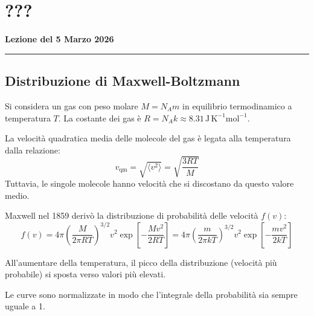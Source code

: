 \documentclass{article}
\theoremstyle{remark}
\newcommand{\thelezione}{}
\newcommand{\lezione}[2]{
\newpage
\renewcommand{\thelezione}{#2} 
\section{#1} 
\noindent\textbf{\color{RoyalBlue}Lezione del #2}\par\vspace{0.5em}\hrule\vspace{1em}
}
\begin{document}
\lezione{???}{5 Marzo 2026}




\pagebreak

\subsection{Distribuzione di Maxwell-Boltzmann}

Si considera un gas con peso molare \( M = N_A m \) in equilibrio termodinamico a temperatura \( T \). La costante dei gas è \( R = N_A k \approx 8.31 \, \text{J} \, \text{K}^{-1} \text{mol}^{-1} \).

La velocità quadratica media delle molecole del gas è legata alla temperatura dalla relazione:
    \[
    v_{\text{qm}} = \sqrt{\langle v^2 \rangle} = \sqrt{\frac{3RT}{M}}
    \]
    Tuttavia, le singole molecole hanno velocità che si discostano da questo valore medio.

Maxwell nel 1859 derivò la distribuzione di probabilità delle velocità \( f(v) \):
    \[
    f(v) = 4\pi \left( \frac{M}{2\pi RT} \right)^{3/2} v^2 \exp \left[ -\frac{Mv^2}{2RT} \right] = 4\pi \left( \frac{m}{2\pi kT} \right)^{3/2} v^2 \exp \left[ -\frac{mv^2}{2kT} \right]
    \]

    All'aumentare della temperatura, il picco della distribuzione (velocità più probabile) si sposta verso valori più elevati.

Le curve sono normalizzate in modo che l'integrale della probabilità sia sempre uguale a 1.
\end{document}
